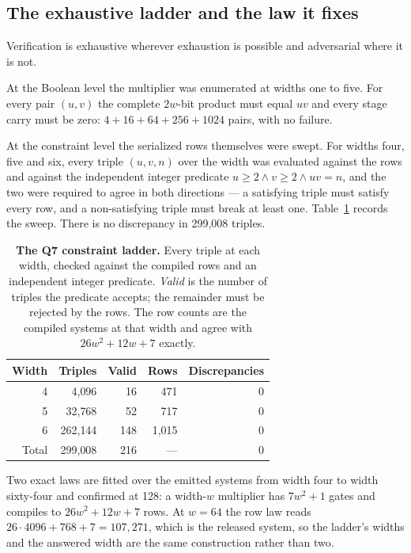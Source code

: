 \documentclass[11pt,a4paper]{article}
\begin{document}
\subsection{The exhaustive ladder and the law it fixes}
Verification is exhaustive wherever exhaustion is possible and adversarial where
it is not.

At the Boolean level the multiplier was enumerated at widths one to five. For
every pair $(u,v)$ the complete $2w$-bit product must equal $uv$ and every stage
carry must be zero: $4+16+64+256+1024$ pairs, with no failure.

At the constraint level the serialized rows themselves were swept. For widths
four, five and six, every triple $(u,v,n)$ over the width was evaluated against
the rows and against the independent integer predicate $u\ge2\wedge v\ge2\wedge
uv=n$, and the two were required to agree in both directions --- a satisfying
triple must satisfy every row, and a non-satisfying triple must break at least
one. Table~\ref{tab:ladder} records the sweep. There is no discrepancy in
299{,}008 triples.

\begin{table}[htbp]
\centering
\caption{\textbf{The Q7 constraint ladder.} Every triple at each width, checked
against the compiled rows and an independent integer predicate. \emph{Valid} is
the number of triples the predicate accepts; the remainder must be rejected by
the rows. The row counts are the compiled systems at that width and agree with
$26w^2+12w+7$ exactly.}\label{tab:ladder}
\begin{tabular}{rrrrr}
\toprule
Width & Triples & Valid & Rows & Discrepancies\\\midrule
4 & 4{,}096 & 16 & 471 & 0\\
5 & 32{,}768 & 52 & 717 & 0\\
6 & 262{,}144 & 148 & 1{,}015 & 0\\\midrule
Total & 299{,}008 & 216 & --- & 0\\
\bottomrule
\end{tabular}
\end{table}

Two exact laws are fitted over the emitted systems from width four to width
sixty-four and confirmed at 128: a width-$w$ multiplier has $7w^2+1$ gates and
compiles to $26w^2+12w+7$ rows. At $w=64$ the row law reads
$26\cdot4096+768+7=107{,}271$, which is the released system, so the ladder's
widths and the answered width are the same construction rather than two.
\end{document}
